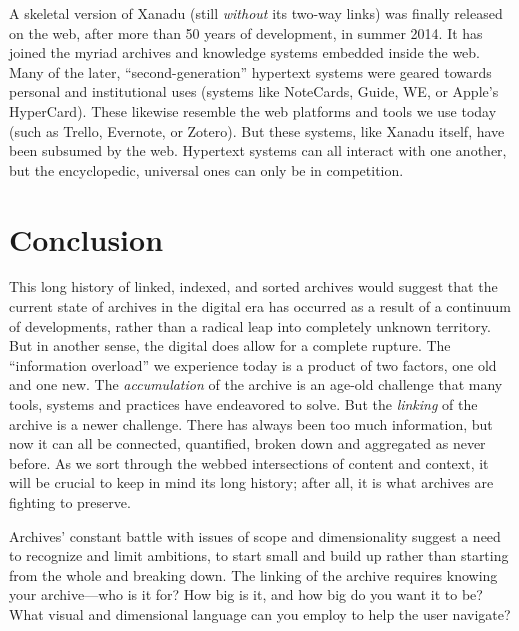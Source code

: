 A skeletal version of Xanadu (still \emph{without} its two-way links) was finally released on the web, after more than 50 years of development, in summer 2014.\autocites{carmody_pioneering_2014}{hern_worlds_2014} It has joined the myriad archives and knowledge systems embedded inside the web. Many of the later, ``second-generation'' hypertext systems were geared towards personal and institutional uses (systems like NoteCards, Guide, WE, or Apple's HyperCard).\autocite{halasz_reflections_1988} These likewise resemble the web platforms and tools we use today (such as Trello, Evernote, or Zotero). But these systems, like Xanadu itself, have been subsumed by the web. Hypertext systems can all interact with one another, but the encyclopedic, universal ones can only be in competition.

\section{Conclusion}

This long history of linked, indexed, and sorted archives would suggest that the current state of archives in the digital era has occurred as a result of a continuum of developments, rather than a radical leap into completely unknown territory. But in another sense, the digital does allow for a complete rupture. The ``information overload'' we experience today is a product of two factors, one old and one new. The \emph{accumulation} of the archive is an age-old challenge that many tools, systems and practices have endeavored to solve. But the \emph{linking} of the archive is a newer challenge. There has always been too much information, but now it can all be connected, quantified, broken down and aggregated as never before. As we sort through the webbed intersections of content and context, it will be crucial to keep in mind its long history; after all, it is what archives are fighting to preserve.

Archives' constant battle with issues of scope and dimensionality suggest a need to recognize and limit ambitions, to start small and build up rather than starting from the whole and breaking down. The linking of the archive requires knowing your archive---who is it for? How big is it, and how big do you want it to be? What visual and dimensional language can you employ to help the user navigate?

